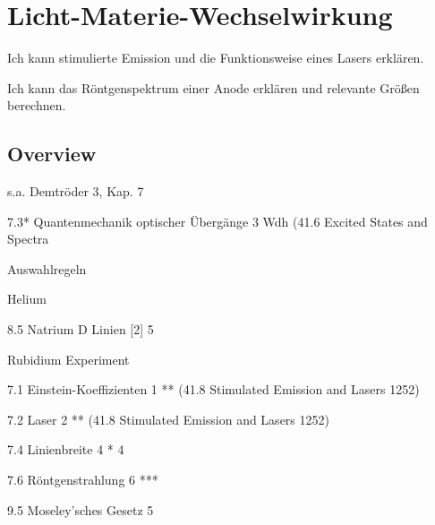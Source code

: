 \renewcommand{\lastmod}{10. September 2024}
\renewcommand{\chapterauthors}{Markus Lippitz}

\chapter{Licht-Materie-Wechselwirkung}




Ich kann stimulierte Emission und die Funktionsweise eines Lasers erklären.

Ich kann das Röntgenspektrum einer Anode erklären und relevante Größen berechnen.


\section{Overview}

s.a. Demtröder 3, Kap. 7

7.3* Quantenmechanik optischer Übergänge 3	Wdh (41.6 Excited States and Spectra

Auswahlregeln

Helium

8.5 Natrium D Linien [2] 5

Rubidium Experiment

7.1 Einstein-Koeffizienten 1	** (41.8 Stimulated Emission and Lasers 1252)


7.2 Laser 2	** (41.8 Stimulated Emission and Lasers 1252)


7.4 Linienbreite 4	*	4 

7.6 Röntgenstrahlung 6	***	

9.5 Moseley’sches Gesetz 5	








